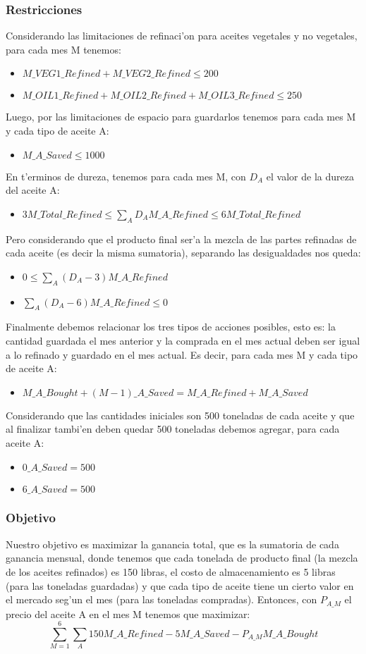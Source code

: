 \subsubsection{Restricciones}
Considerando las limitaciones de refinaci'on para aceites vegetales y no vegetales, para cada mes M tenemos:
\begin{itemize}
\item$M\_VEG1\_Refined + M\_VEG2\_Refined \leq 200$
\item$M\_OIL1\_Refined + M\_OIL2\_Refined + M\_OIL3\_Refined \leq 250$
\end{itemize}
Luego, por las limitaciones de espacio para guardarlos tenemos para cada mes M y cada tipo de aceite A:
\begin{itemize}
\item$M\_A\_Saved \leq 1000$
\end{itemize}
En t'erminos de dureza, tenemos para cada mes M, con $D_A$ el valor de la dureza del aceite A:
\begin{itemize}
\item$3 M\_Total\_Refined \leq  \sum_{A}^{} D_{A} M\_A\_Refined \leq 6 M\_Total\_Refined$
\end{itemize}
Pero considerando que el producto final ser'a la mezcla de las partes refinadas de cada aceite (es decir la misma sumatoria), separando las desigualdades nos queda:
\begin{itemize}
\item$0 \leq  \sum_{A}^{} (D_{A} - 3) M\_A\_Refined$
\item$\sum_{A}^{} (D_{A} - 6) M\_A\_Refined \leq 0$
\end{itemize}
Finalmente debemos relacionar los tres tipos de acciones posibles, esto es: la cantidad guardada el mes anterior y la comprada en el mes actual deben ser igual a lo refinado y guardado en el mes actual. Es decir, para cada mes M y cada tipo de aceite A:
\begin{itemize}
\item$M\_A\_Bought + (M-1)\_A\_Saved = M\_A\_Refined + M\_A\_Saved$
\end{itemize}
Considerando que las cantidades iniciales son 500 toneladas de cada aceite y que al finalizar tambi'en deben quedar 500 toneladas debemos agregar, para cada aceite A:
\begin{itemize}
\item$0\_A\_Saved = 500$
\item$6\_A\_Saved = 500$
\end{itemize}
\subsubsection{Objetivo}
Nuestro objetivo es maximizar la ganancia total, que es la sumatoria de cada ganancia mensual, donde tenemos que cada tonelada de producto final (la mezcla de los aceites refinados) es 150 libras, el costo de almacenamiento es 5 libras (para las toneladas guardadas) y que cada tipo de aceite tiene un cierto valor en el mercado seg'un el mes (para las toneladas compradas). Entonces, con $P_{A\_M}$ el precio del aceite A en el mes M tenemos que maximizar:
$$\sum_{M=1}^{6} \sum_{A}^{} 150 M\_A\_Refined - 5 M\_A\_Saved - P_{A\_M} M\_A\_Bought$$
